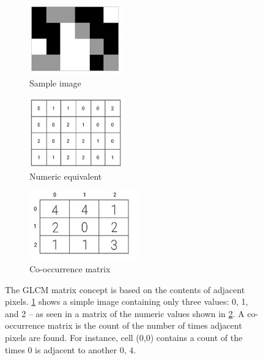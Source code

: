 \documentclass[letterpaper]{report}
\begin{document}
\begin{figure}[H]
	\begin{subfigure}[h]{0.28\linewidth}
		\includegraphics[height=3cm]{./figures/glcm-example.jpg}
		\caption{Sample image}
		\label{subfig:glcm_sample}	
	\end{subfigure}
	\hfill
	\begin{subfigure}[h]{0.28\linewidth}
		\includegraphics[height=3cm]{./figures/glcm-numeric.jpg}
		\caption{Numeric equivalent}
		\label{subfig:glcm_numeric}		
	\end{subfigure}
	\hfill
	\begin{subfigure}[h]{0.28\linewidth}
		\includegraphics[height=3cm]{./figures/glcm-matrix.jpg}
		\caption{Co-occurrence matrix}
		\label{subfig:glcm_matrix}		
	\end{subfigure}%
	\hfill
	\caption[GLCM matrix explained]{The GLCM matrix concept is based on the contents of adjacent pixels. \ref{subfig:glcm_sample} shows a simple image containing only three values: 0, 1, and 2 -- as seen in a matrix of the numeric values shown in \ref{subfig:glcm_numeric}. A co-occurrence matrix is the count of the number of times adjacent pixels are found.  For instance, cell (0,0) contains a count of the times $0$ is adjacent to another $0$, $4$.}
	\label{fig:glcm-explained}
\end{figure}
\end{document}
